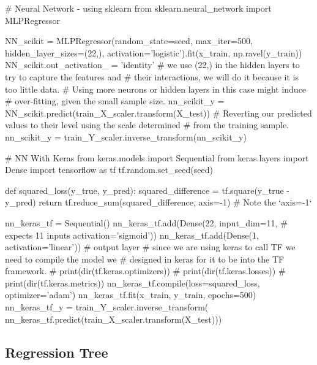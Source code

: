 \documentclass[11pt]{article}
\begin{document}
\begin{pyverbatim}[][]
# Neural Network - using sklearn
from sklearn.neural_network import MLPRegressor

NN_scikit = MLPRegressor(random_state=seed,
                         max_iter=500,
                         hidden_layer_sizes=(22,),
                         activation='logistic').fit(x_train,
                                                    np.ravel(y_train))
NN_scikit.out_activation_ = 'identity'
# we use (22,) in the hidden layers to try to capture the features and
# their interactions, we will do it because it is too little data.
# Using more neurons or hidden layers in this case might induce
# over-fitting, given the small sample size.
nn_scikit_y = NN_scikit.predict(train_X_scaler.transform(X_test))
# Reverting our predicted values to their level using the scale determined
# from the training sample.
nn_scikit_y = train_Y_scaler.inverse_transform(nn_scikit_y)
\end{pyverbatim}


\begin{pyverbatim}[][]
# NN With Keras
from keras.models import Sequential
from keras.layers import Dense
import tensorflow as tf
tf.random.set_seed(seed)


def squared_loss(y_true, y_pred):
    squared_difference = tf.square(y_true - y_pred)
    return tf.reduce_sum(squared_difference, axis=-1)  # Note the `axis=-1`


nn_keras_tf = Sequential()
nn_keras_tf.add(Dense(22,
                      input_dim=11,  # expects 11 inputs
                      activation='sigmoid'))
nn_keras_tf.add(Dense(1, activation='linear'))  # output layer
# since we are using keras to call TF we need to compile the model we
# designed in keras for it to be into the TF framework.
# print(dir(tf.keras.optimizers))
# print(dir(tf.keras.losses))
# print(dir(tf.keras.metrics))
nn_keras_tf.compile(loss=squared_loss, optimizer='adam')
nn_keras_tf.fit(x_train, y_train, epochs=500)
nn_keras_tf_y = train_Y_scaler.inverse_transform(
                nn_keras_tf.predict(train_X_scaler.transform(X_test)))
\end{pyverbatim}

\subsection{Regression Tree}\label{subsec:regression-tree}
\end{document}
